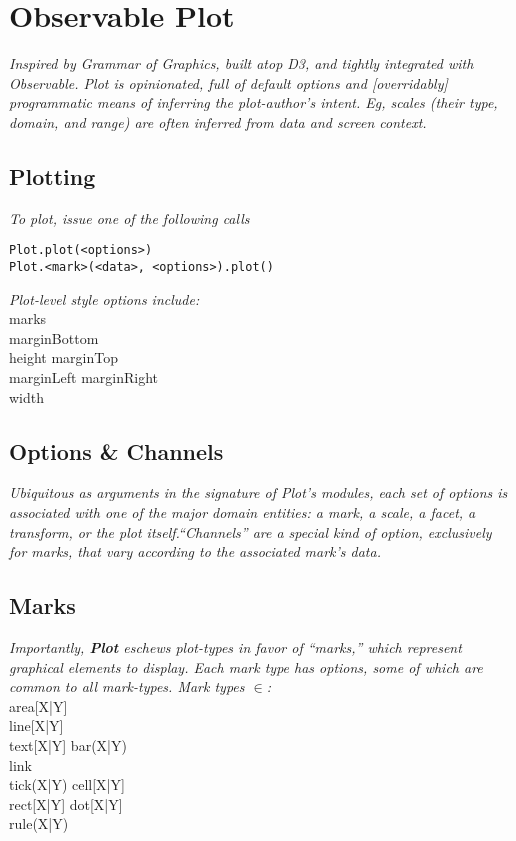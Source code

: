 \section{Observable Plot}

\textit{Inspired by Grammar of Graphics, built atop D3, and tightly integrated with Observable. Plot is opinionated, full of default options and [overridably] programmatic means of inferring the plot-author's intent. Eg, scales (their type, domain, and range) are often inferred from data and screen context.}


\subsection*{Plotting}
\textit{To plot, issue one of the following calls}
\begin{lstlisting}
Plot.plot(<options>)
Plot.<mark>(<data>, <options>).plot()
\end{lstlisting}
\textit{Plot-level style options include:}\\
\api
{\widththree}{marks \\ marginBottom \\ height}
{\widththree}{marginTop \\ marginLeft}
{\widththree}{marginRight \\ width}
\stopapi

\subsection*{Options \& Channels}
\textit{Ubiquitous as arguments in the signature of Plot's modules, each set of options is associated with one of the major domain entities: a mark, a scale, a facet, a transform, or the plot itself.}\textit{``Channels'' are a special kind of option, exclusively for marks, that vary according to the associated mark's data.}

\api
\stopapi


\subsection*{Marks}
\textit{Importantly, {\rm\bf Plot} eschews plot-types in favor of ``marks,'' which represent graphical elements to display. Each mark type has options, some of which are common to all mark-types. Mark types $\in$:}\\
\api
{\widthfour}{area[X|Y] \\ line[X|Y] \\ text[X|Y]}
{\widthfour}{bar(X|Y) \\ link \\ tick(X|Y)}
{\widthfour}{cell[X|Y] \\ rect[X|Y]}
{\widthfour}{dot[X|Y] \\ rule(X|Y)}
\stopapi
\vspace{1mm}


